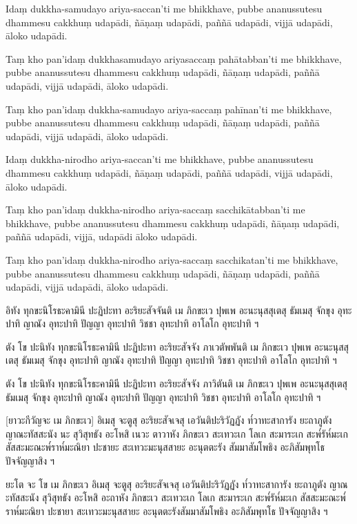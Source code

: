 \documentclass[
  babelLanguage=thai,
  final,
]{chantingbook}
\begin{document}
Idaṃ dukkha-samudayo ariya-saccan'ti me bhikkhave, pubbe ananussutesu
dhammesu cakkhuṃ udapādi, ñāṇaṃ udapādi, paññā udapādi, vijjā udapādi,
āloko udapādi.

Taṃ kho pan'idaṃ dukkhasamudayo ariyasaccaṃ pahātabban'ti me bhikkhave,
pubbe ananussutesu dhammesu cakkhuṃ udapādi, ñāṇaṃ udapādi, paññā
udapādi, vijjā udapādi, āloko udapādi.

Taṃ kho pan'idaṃ dukkha-samudayo ariya-saccaṃ pahīnan'ti me bhikkhave, pubbe
ananussutesu dhammesu cakkhuṃ udapādi, ñāṇaṃ udapādi, paññā udapādi,
vijjā udapādi, āloko udapādi.

Idaṃ dukkha-nirodho ariya-saccan'ti me bhikkhave, pubbe ananussutesu
dhammesu cakkhuṃ udapādi, ñāṇaṃ udapādi, paññā udapādi, vijjā udapādi,
āloko udapādi.

Taṃ kho pan'idaṃ dukkha-nirodho ariya-saccaṃ sacchikātabban'ti me bhikkhave,
pubbe ananussutesu dhammesu cakkhuṃ udapādi, ñāṇaṃ udapādi, paññā
udapādi, vijjā, udapādi āloko udapādi.

Taṃ kho pan'idaṃ dukkha-nirodho ariya-saccaṃ sacchikatan'ti me bhikkhave,
pubbe ananussutesu dhammesu cakkhuṃ udapādi, ñāṇaṃ udapādi, paññā
udapādi, vijjā udapādi, āloko udapādi.

\clearpage

\thaiText
\markboth{\thaiTitle}{\rightmark}

อิทัง ทุกขะนิโรธะคามินี ปะฏิปะทา อะริยะสัจจันติ เม ภิกขะเว ปุพเพ อะนะนุสสุเตสุ ธัมเมสุ
จักขุง อุทะปาทิ ญาณัง อุทะปาทิ ปัญญา อุทะปาทิ วิชชา อุทะปาทิ อาโลโก อุทะปาทิ ฯ

ตัง โข ปะนิทัง ทุกขะนิโรธะคามินี ปะฏิปะทา อะริยะสัจจัง ภาเวตัพพันติ เม ภิกขะเว ปุพเพ อะนะนุสสุเตสุ
ธัมเมสุ จักขุง อุทะปาทิ ญาณัง อุทะปาทิ ปัญญา อุทะปาทิ วิชชา อุทะปาทิ อาโลโก อุทะปาทิ ฯ

ตัง โข ปะนิทัง ทุกขะนิโรธะคามินี ปะฏิปะทา อะริยะสัจจัง ภาวิตันติ เม ภิกขะเว ปุพเพ อะนะนุสสุเตสุ
ธัมเมสุ จักขุง อุทะปาทิ ญาณัง อุทะปาทิ ปัญญา อุทะปาทิ วิชชา อุทะปาทิ อาโลโก อุทะปาทิ ฯ

[ยาวะกีวัญจะ เม ภิกขะเว] อิเมสุ จะตูสุ อะริยะสัจเจสุ เอวันติปะริวัฏฏัง
ท๎วาทะสาการัง ยะถาภูตัง ญาณะทัสสะนัง นะ สุวิสุทธัง อะโหสิ 
เนวะ ตาวาหัง ภิกขะเว สะเทวะเก โลเก สะมาระเก สะพ๎รัห๎มะเก สัสสะมะณะพ๎ราห๎มะณิยา
ปะชายะ สะเทวะมะนุสสายะ อะนุตตะรัง สัมมาสัมโพธิง อะภิสัมพุทโธ ปัจจัญญาสิง ฯ

ยะโต จะ โข เม ภิกขะเว อิเมสุ จะตูสุ อะริยะสัจเจสุ เอวันติปะริวัฏฏัง
ท๎วาทะสาการัง ยะถาภูตัง ญาณะทัสสะนัง สุวิสุทธัง อะโหสิ
อะถาหัง ภิกขะเว สะเทวะเก โลเก สะมาระเก สะพ๎รัห๎มะเก สัสสะมะณะพ๎ราห๎มะณิยา
ปะชายา สะเทวะมะนุสสายะ อะนุตตะรังสัมมาสัมโพธิง อะภิสัมพุทโธ ปัจจัญญาสิง ฯ
\end{document}
